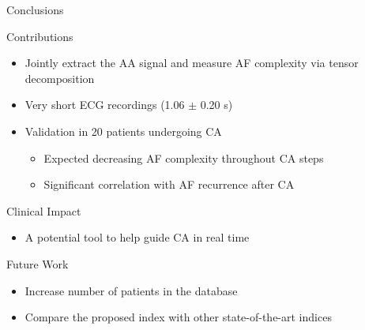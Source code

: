 \documentclass{beamer}
\begin{document}
	\begin{frame}{Conclusions} 
		
		\begin{block}{Contributions}
			\begin{itemize}
				\item Jointly extract the AA signal and measure AF complexity via tensor decomposition
				\item Very short ECG recordings (1.06 $\pm$ 0.20 s)
				\item Validation in 20 patients undergoing CA
				\begin{itemize}
					\item Expected decreasing AF complexity throughout CA steps
					\item Significant correlation with AF recurrence after CA
				\end{itemize}
			\end{itemize}
		\end{block}
		
		\begin{block}{Clinical Impact}
			\begin{itemize}
				\item A potential tool to help guide CA in real time
			\end{itemize}
		\end{block}

		\begin{block}{Future Work}
			\begin{itemize}
				\item Increase number of patients in the database
				\item Compare the proposed index with other state-of-the-art indices
			\end{itemize}
		\end{block}
		
	\end{frame}
		
\end{document}
